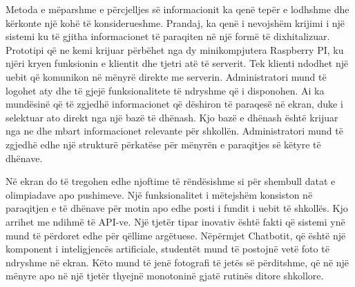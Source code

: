 Metoda e m\"{e}parshme e p\"{e}rcjelljes s\"{e} informacionit ka qen\"{e} tep\"{e}r e lodhshme dhe k\"{e}rkonte nj\"{e} koh\"{e} t\"{e} konsiderueshme. Prandaj, ka qen\"{e} i nevojsh\"{e}m krijimi i nj\"{e} sistemi ku t\"{e} gjitha informacionet t\"{e} paraqiten n\"{e} nj\"{e} form\"{e} t\"{e} dixhitalizuar.  Prototipi q\"{e} ne kemi krijuar p\"{e}rb\"{e}het nga dy minikompjutera Raspberry PI, ku nj\"{e}ri kryen funksionin e klientit dhe tjetri at\"{e} t\"{e} serverit. Tek klienti ndodhet nj\"{e} uebit q\"{e} komunikon n\"{e} m\"{e}nyr\"{e} direkte me serverin. Administratori mund t\"{e} logohet aty dhe t\"{e} gjej\"{e} funksionalitete t\"{e} ndryshme q\"{e} i disponohen. Ai ka mund\"{e}sin\"{e} q\"{e} t\"{e} zgjedh\"{e} informacionet q\"{e} d\"{e}shiron t\"{e} paraqes\"{e} n\"{e} ekran, duke i selektuar ato direkt nga nj\"{e} baz\"{e} t\"{e} dh\"{e}nash. Kjo baz\"{e} e dh\"{e}nash \"{e}sht\"{e} krijuar nga ne dhe mbart informacionet relevante p\"{e}r shkoll\"{e}n. Administratori mund t\"{e} zgjedh\"{e} edhe nj\"{e} struktur\"{e} p\"{e}rkat\"{e}se p\"{e}r m\"{e}nyr\"{e}n e paraqitjes s\"{e} k\"{e}tyre t\"{e} dh\"{e}nave. 

N\"{e} ekran do t\"{e} tregohen edhe njoftime t\"{e} r\"{e}nd\"{e}sishme si p\"{e}r shembull datat e olimpiadave apo pushimeve.  Nj\"{e} funksionalitet i m\"{e}tejsh\"{e}m konsiston n\"{e} paraqitjen e t\"{e} dh\"{e}nave p\"{e}r motin apo edhe posti i fundit i uebit t\"{e} shkoll\"{e}s. Kjo arrihet me ndihm\"{e} t\"{e} API-ve. 
Nj\"{e} tjet\"{e}r tipar inovativ \"{e}sht\"{e} fakti q\"{e} sistemi yn\"{e} mund t\"{e} p\"{e}rdoret edhe p\"{e}r q\"{e}llime arg\"{e}tuese. N\"{e}p\"{e}rmjet Chatbotit, q\"{e} \"{e}sht\"{e} nj\"{e} komponent i inteligjenc\"{e}s artificiale, student\"{e}t mund t\"{e} postojn\"{e} vet\"{e} foto t\"{e} ndryshme n\"{e} ekran. K\"{e}to mund t\"{e} jen\"{e} fotografi t\"{e} jet\"{e}s s\"{e} p\"{e}rditshme, q\"{e} n\"{e} nj\"{e} m\"{e}nyre apo n\"{e} nj\"{e} tjet\"{e}r thyejn\"{e} monotonin\"{e} gjat\"{e} rutin\"{e}s ditore shkollore.